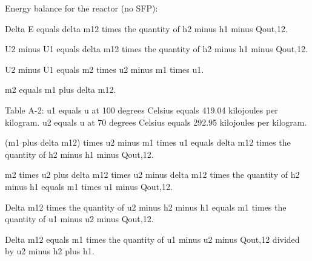 Energy balance for the reactor (no SFP):  

Delta E equals delta m12 times the quantity of h2 minus h1 minus Qout,12.  

U2 minus U1 equals delta m12 times the quantity of h2 minus h1 minus Qout,12.  

U2 minus U1 equals m2 times u2 minus m1 times u1.  

m2 equals m1 plus delta m12.  

Table A-2:  
u1 equals u at 100 degrees Celsius equals 419.04 kilojoules per kilogram.  
u2 equals u at 70 degrees Celsius equals 292.95 kilojoules per kilogram.  

(m1 plus delta m12) times u2 minus m1 times u1 equals delta m12 times the quantity of h2 minus h1 minus Qout,12.  

m2 times u2 plus delta m12 times u2 minus delta m12 times the quantity of h2 minus h1 equals m1 times u1 minus Qout,12.  

Delta m12 times the quantity of u2 minus h2 minus h1 equals m1 times the quantity of u1 minus u2 minus Qout,12.  

Delta m12 equals m1 times the quantity of u1 minus u2 minus Qout,12 divided by u2 minus h2 plus h1.